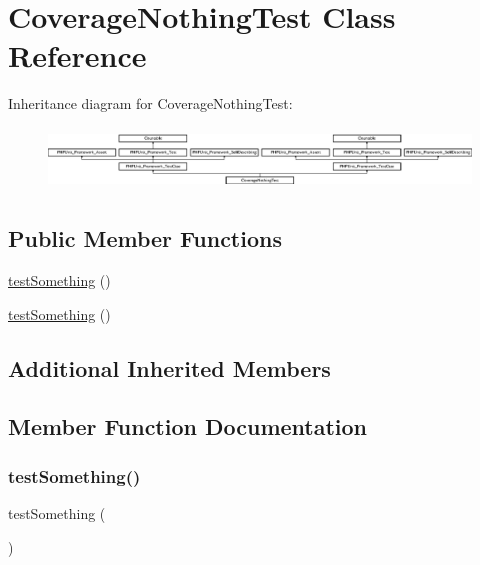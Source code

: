 \hypertarget{class_coverage_nothing_test}{}\section{Coverage\+Nothing\+Test Class Reference}
\label{class_coverage_nothing_test}
Inheritance diagram for Coverage\+Nothing\+Test\+:\begin{figure}[H]
\begin{center}
\leavevmode
\includegraphics[height=1.651917cm]{class_coverage_nothing_test}
\end{center}
\end{figure}
\subsection*{Public Member Functions}
\begin{DoxyCompactItemize}
\item 
\mbox{\hyperlink{class_coverage_nothing_test_a0fc4e17369bc9607ebdd850d9eda8167}{test\+Something}} ()
\item 
\mbox{\hyperlink{class_coverage_nothing_test_a0fc4e17369bc9607ebdd850d9eda8167}{test\+Something}} ()
\end{DoxyCompactItemize}
\subsection*{Additional Inherited Members}


\subsection{Member Function Documentation}
\mbox{\label{class_coverage_nothing_test_a0fc4e17369bc9607ebdd850d9eda8167}} 
\subsubsection{\texorpdfstring{test\+Something()}{testSomething()}\hspace{0.1cm}{\footnotesize\ttfamily [1/2]}}
{\footnotesize\ttfamily test\+Something (\begin{DoxyParamCaption}{ }\end{DoxyParamCaption})}

